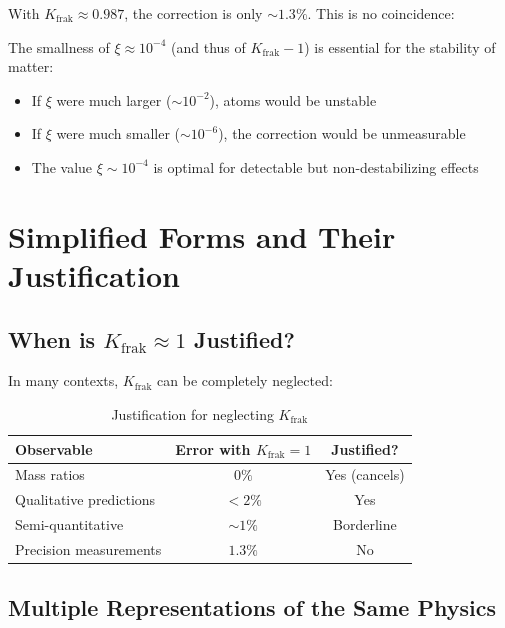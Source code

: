	With $K_{\text{frak}} \approx 0.987$, the correction is only $\sim 1.3\%$. This is no coincidence:
	
	\begin{tcolorbox}[colback=blue!5!white,colframe=blue!75!black,title={Fine-Tuning of Nature}]
		The smallness of $\xi \approx 10^{-4}$ (and thus of $K_{\text{frak}} - 1$) is essential for the stability of matter:
		
		\begin{itemize}
			\item If $\xi$ were much larger ($\sim 10^{-2}$), atoms would be unstable
			\item If $\xi$ were much smaller ($\sim 10^{-6}$), the correction would be unmeasurable
			\item The value $\xi \sim 10^{-4}$ is optimal for detectable but non-destabilizing effects
		\end{itemize}
	\end{tcolorbox}
	
	\section{Simplified Forms and Their Justification}
	
	\subsection{When is $K_{\text{frak}} \approx 1$ Justified?}
	
	In many contexts, $K_{\text{frak}}$ can be completely neglected:
	
	\begin{table}[h]
		\centering
		\begin{tabular}{lcc}
			\toprule
			\textbf{Observable} & \textbf{Error with $K_{\text{frak}} = 1$} & \textbf{Justified?} \\
			\midrule
			Mass ratios & $0\%$ & Yes (cancels) \\
			Qualitative predictions & $< 2\%$ & Yes \\
			Semi-quantitative & $\sim 1\%$ & Borderline \\
			Precision measurements & $1.3\%$ & No \\
			\bottomrule
		\end{tabular}
		\caption{Justification for neglecting $K_{\text{frak}}$}
	\end{table}
	
	\subsection{Multiple Representations of the Same Physics}
	
